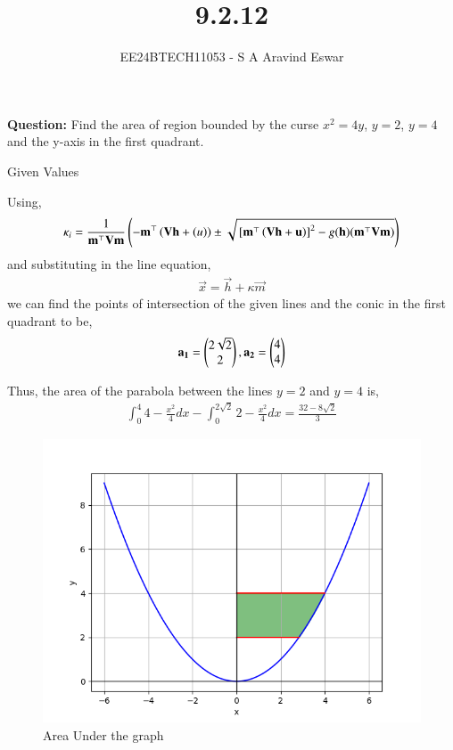 \documentclass[journal]{IEEEtran}
\begin{document}

\vspace{3cm}

\title{9.2.12}
\author{EE24BTECH11053 - S A Aravind Eswar}
{\let\newpage\relax\maketitle}

\renewcommand{\thefigure}{\theenumi}
\renewcommand{\thetable}{\theenumi}
\setlength{\intextsep}{10pt} %


\renewcommand{\thetable}{\theenumi}

\textbf{Question: } Find the area of region bounded by the curse $x^2 = 4y$,  $y=2$, $y=4$ and the y-axis in the first quadrant. 

\solution
\begin{table}[h]
    \centering
    
    \caption{Given Values}
    \label{tab:1}
\end{table}

Using,
\begin{align}
    \kappa_i = \frac{1}{\mathbf{m}^\top\mathbf{V}\mathbf{m}}\left(-\mathbf{m}^\top\left(\mathbf{Vh}+\left(u\right)\right)\pm \sqrt{{}\left[\mathbf{m}^\top\left(\mathbf{Vh}+\mathbf{u}\right)\right]^2 - g(\mathbf{h})(\mathbf{m}^\top\mathbf{Vm})}\right)
\end{align}
and substituting in the line equation,
\begin{align}
    \vec{x} = \vec{h} + \kappa\vec{m}
\end{align}
we can find the points of intersection of the given lines and the conic in the first quadrant to be,
\begin{align}
    \mathbf{a_1} = \begin{pmatrix}2\sqrt{2}\\2\end{pmatrix}, \mathbf{a_2} = \begin{pmatrix}4\\4\end{pmatrix}
\end{align}

Thus, the area of the parabola between the lines $y = 2$ and $y = 4$ is,
\begin{align}
    \int_{0}^{4} 4-\frac{x^2}{4} dx - \int_{0}^{2\sqrt{2}} 2-\frac{x^2}{4} dx = \frac{32 - 8\sqrt{2}}{3}
\end{align}

\begin{figure}[h]
    \centering
    \includegraphics[width=\columnwidth]{figs/fig1.png}
    \caption{Area Under the graph}
\end{figure}
\end{document}
